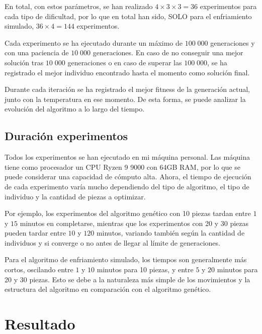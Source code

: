 \documentclass[11pt,spanish,listoffigures,listoftables]{tfgetsinf}
\begin{document}
En total, con estos parámetros, se han realizado $4 \times 3 \times 3 = 36$ experimentos para cada tipo de dificultad, por lo que en total han sido, SOLO para el enfriamiento simulado, $36 \times 4 = 144$ experimentos.

Cada experimento se ha ejecutado durante un máximo de $100\;000$ generaciones y con una paciencia de $10\;000$ generaciones. En caso de no conseguir una mejor solución tras $10\;000$ generaciones o en caso de superar las $100\;000$, se ha registrado el mejor individuo encontrado hasta el momento como solución final.

Durante cada iteración se ha registrado el mejor fitness de la generación actual, junto con la temperatura en ese momento. De esta forma, se puede analizar la evolución del algoritmo a lo largo del tiempo.

\section{Duración experimentos}
Todos los experimentos se han ejecutado en mi máquina personal. Las máquina tiene como procesador un CPU Ryzen 9 9000 con 64GB RAM, por lo que se puede considerar una capacidad de cómputo alta. Ahora, el tiempo de ejecución de cada experimento varía mucho dependiendo del tipo de algoritmo, el tipo de individuo y la cantidad de piezas a optimizar. 

Por ejemplo, los experimentos del algoritmo genético con 10 piezas tardan entre $1$ y $15$ minutos en completarse, mientras que los experimentos con 20 y 30 piezas pueden tardar entre $10$ y $120$ minutos, variando también según la cantidad de individuos y si converge o no antes de llegar al límite de generaciones.

Para el algoritmo de enfriamiento simulado, los tiempos son generalmente más cortos, oscilando entre $1$ y $10$ minutos para 10 piezas, y entre $5$ y $20$ minutos para 20 y 30 piezas. Esto se debe a la naturaleza más simple de los movimientos y la estructura del algoritmo en comparación con el algoritmo genético.

\chapter{Resultado}
\end{document}
